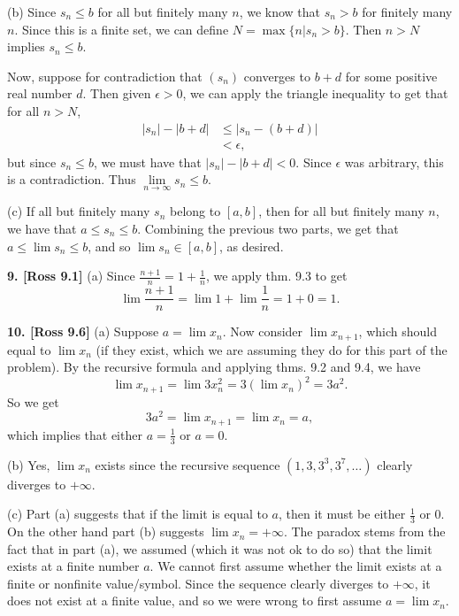 (b) Since $s_n \leq b$ for all but finitely many $n$, we know that $s_n > b$ for finitely many $n$. Since this is a finite set, we can define $N = \max\{n | s_n > b\}$. Then $n > N$ implies $s_n \leq b$. 

Now, suppose for contradiction that $(s_n)$ converges to $b + d$ for some positive real number $d$. Then given $\epsilon > 0$, we can apply the triangle inequality to get that for all $n > N$,
\begin{align*}
    |s_n| - |b + d| &\leq |s_n - (b + d)| \\
        &< \epsilon,
\end{align*}
but since $s_n \leq b$, we must have that $|s_n| - |b + d| < 0$. Since $\epsilon$ was arbitrary, this is a contradiction. Thus $\lim\limits_{n \to \infty}s_n \leq b$.

(c) If all but finitely many $s_n$ belong to $[a, b]$, then for all but finitely many $n$, we have that $a \leq s_n \leq b$. Combining the previous two parts, we get that $a \leq \lim s_n \leq b$, and so $\lim s_n \in [a, b]$, as desired.

\textbf{9. [Ross 9.1]} (a) Since $\frac{n + 1}{n} = 1 + \frac{1}{n}$, we apply thm. 9.3 to get
\[
\lim \frac{n + 1}{n} = \lim 1 + \lim \frac{1}{n} = 1 + 0 = 1.
\]

\textbf{10. [Ross 9.6]} (a) Suppose $a = \lim x_n$. Now consider $\lim x_{n + 1}$, which should equal to $\lim x_n$ (if they exist, which we are assuming they do for this part of the problem). By the recursive formula and applying thms. 9.2 and 9.4, we have 
\[
\lim x_{n + 1} = \lim 3x_n^2 = 3(\lim x_n)^2 = 3a^2.
\]
So we get
\[
3a^2 = \lim x_{n + 1} = \lim x_n = a,
\]
which implies that either $a = \frac{1}{3}$ or $a = 0$.

(b) Yes, $\lim x_n$ exists since the recursive sequence $(1, 3, 3^3, 3^7, \dots)$ clearly diverges to $+\infty$.

(c) Part (a) suggests that if the limit is equal to $a$, then it must be either $\frac{1}{3}$ or 0. On the other hand part (b) suggests $\lim x_n = +\infty$. The paradox stems from the fact that in part (a), we assumed (which it was not ok to do so) that the limit exists at a finite number $a$. We cannot first assume whether the limit exists at a finite or nonfinite value/symbol. Since the sequence clearly diverges to $+\infty$, it does not exist at a finite value, and so we were wrong to first assume $a = \lim x_n$.